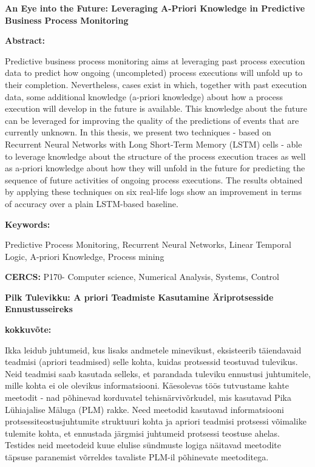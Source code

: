 
\noindent
{\large \textbf{An Eye into the Future: Leveraging A-Priori Knowledge in Predictive Business Process Monitoring}}

\vspace{4mm}
\noindent
\textbf{Abstract:}
\par
\noindent
Predictive business process monitoring aims at leveraging past process execution data to predict how ongoing (uncompleted) process executions will unfold up to their completion. Nevertheless, cases exist in which, together with past
execution data, some additional knowledge (a-priori
knowledge) about how a process execution will develop in the future is available. This knowledge about the future can be leveraged for
improving the quality of the predictions of events that are currently unknown. In this thesis, we present two
techniques - based on Recurrent Neural Networks with Long Short-Term Memory (LSTM) cells - able to
leverage knowledge about the structure of the process execution traces as well as a-priori knowledge about how they will unfold in the future for predicting the sequence of future activities of ongoing process executions. The results obtained by applying these techniques on six real-life logs show an improvement in terms of accuracy over a plain
LSTM-based baseline.

\par
\vspace{4mm}
\noindent
\textbf{Keywords:} 
\par 
\noindent
Predictive Process Monitoring, Recurrent Neural Networks, Linear Temporal Logic, A-priori Knowledge, Process mining


\par
\vspace{4mm}
\noindent
\textbf{CERCS:} P170- Computer science, Numerical Analysis, Systems, Control


\vspace{4mm}
\noindent
{\large \textbf{Pilk Tulevikku: A priori Teadmiste Kasutamine Äriprotsesside Ennustusseireks}}

\vspace{4mm}
\noindent
\textbf{kokkuvõte:}
\par
\noindent
Ikka leidub juhtumeid, kus lisaks andmetele minevikust, eksisteerib täiendavaid teadmisi (apriori teadmised) selle kohta, kuidas protsessid teostuvad tulevikus. Neid teadmisi saab kasutada selleks, et parandada tuleviku ennustusi juhtumitele, mille kohta ei ole olevikus informatsiooni. Käesolevas töös tutvustame kahte meetodit - nad põhinevad korduvatel tehisnärvivõrkudel, mis kasutavad Pika Lühiajalise Mäluga (PLM) rakke. Need meetodid kasutavad informatsiooni protsessiteostusjuhtumite struktuuri kohta ja apriori teadmisi protsessi võimalike tulemite kohta, et ennustada järgmisi juhtumeid protsessi teostuse ahelas. Testides neid meetodeid kuue elulise sündmuste logiga näitavad meetodite täpsuse paranemist võrreldes tavaliste PLM-il põhinevate meetoditega.

